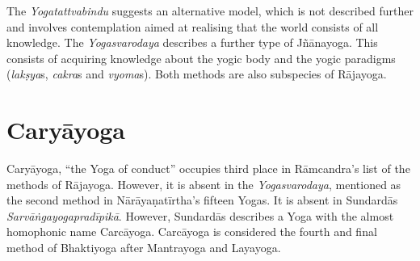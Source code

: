 The \textit{Yogatattvabindu} suggests an alternative model, which is not described further and involves contemplation aimed at realising that the world consists of all knowledge. The \textit{Yogasvarodaya} describes a further type of Jñānayoga. This consists of acquiring knowledge about the yogic body and the yogic paradigms (\textit{lakṣya}s, \textit{cakra}s and \textit{vyoma}s). Both methods are also subspecies of Rājayoga.


\section{Caryāyoga}
\label{caryayogaintro}

Caryāyoga, ``the Yoga of conduct'' occupies third place in Rāmcandra's list of the methods of Rājayoga. However, it is absent in the \textit{Yogasvarodaya}, mentioned as the second method in Nārāyaṇatīrtha's fifteen Yogas. It is absent in Sundardās \textit{Sarvāṅgayogapradīpikā}. However, Sundardās describes a Yoga with the almost homophonic name Carcāyoga. Carcāyoga is considered the fourth and final method of Bhaktiyoga after Mantrayoga and Layayoga. 

